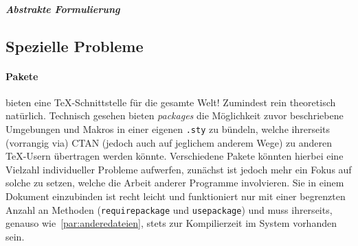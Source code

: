 \subparagraph*{Abstrakte Formulierung}






\newpage
\subsection{Spezielle Probleme}
\paragraph*{Pakete} bieten eine \TeX{}-Schnittstelle für die gesamte Welt! Zumindest rein theoretisch natürlich. Technisch gesehen bieten \textit{packages} die Möglichkeit zuvor beschriebene Umgebungen und Makros in einer eigenen \texttt{.sty} zu bündeln, welche ihrerseits (vorrangig via) CTAN (jedoch auch auf jeglichem anderem Wege) zu anderen \TeX{}-Usern übertragen werden könnte. Verschiedene Pakete könnten hierbei eine Vielzahl individueller Probleme aufwerfen, zunächst ist jedoch mehr ein Fokus auf solche zu setzen, welche die Arbeit anderer Programme involvieren. Sie in einem Dokument einzubinden ist recht leicht und funktioniert nur mit einer begrenzten Anzahl an Methoden (\texttt{requirepackage} und \texttt{usepackage}) und muss ihrerseits, genauso wie~\ref{par:anderedateien}, stets zur Kompilierzeit im System vorhanden sein. 

